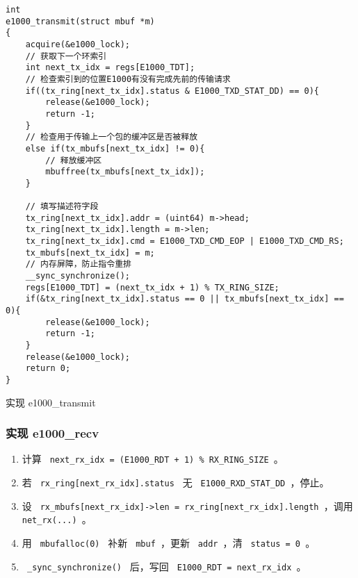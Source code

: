 \begin{listing}[!htb]
	\begin{verbatim}
int
e1000_transmit(struct mbuf *m)
{
    acquire(&e1000_lock);
    // 获取下一个环索引
    int next_tx_idx = regs[E1000_TDT];
    // 检查索引到的位置E1000有没有完成先前的传输请求
    if((tx_ring[next_tx_idx].status & E1000_TXD_STAT_DD) == 0){
        release(&e1000_lock);
        return -1;
    }
    // 检查用于传输上一个包的缓冲区是否被释放
    else if(tx_mbufs[next_tx_idx] != 0){
        // 释放缓冲区
        mbuffree(tx_mbufs[next_tx_idx]);
    }

    // 填写描述符字段
    tx_ring[next_tx_idx].addr = (uint64) m->head;
    tx_ring[next_tx_idx].length = m->len;
    tx_ring[next_tx_idx].cmd = E1000_TXD_CMD_EOP | E1000_TXD_CMD_RS;
    tx_mbufs[next_tx_idx] = m;
    // 内存屏障，防止指令重排
    __sync_synchronize();
    regs[E1000_TDT] = (next_tx_idx + 1) % TX_RING_SIZE;
    if(&tx_ring[next_tx_idx].status == 0 || tx_mbufs[next_tx_idx] == 0){
        release(&e1000_lock);
        return -1;
    }
    release(&e1000_lock);
    return 0;
}
	\end{verbatim}
	\caption{实现 e1000\_transmit}\label{lst:e1000_transmit}
\end{listing}

\subsubsection{实现 e1000\_recv}

\begin{enumerate}
	\item 计算 \texttt{ next\_rx\_idx = (E1000\_RDT + 1) \% RX\_RING\_SIZE }。
	\item 若 \texttt{ rx\_ring[next\_rx\_idx].status } 无 \texttt{ E1000\_RXD\_STAT\_DD }，停止。
	\item 设 \texttt{ rx\_mbufs[next\_rx\_idx]->len = rx\_ring[next\_rx\_idx].length }，调用 \texttt{ net\_rx(...) }。
	\item 用 \texttt{ mbufalloc(0) } 补新 \texttt{ mbuf }，更新 \texttt{ addr }，清 \texttt{ status = 0 }。
	\item \texttt{ \_sync\_synchronize() } 后，写回 \texttt{ E1000\_RDT = next\_rx\_idx }。
\end{enumerate}

